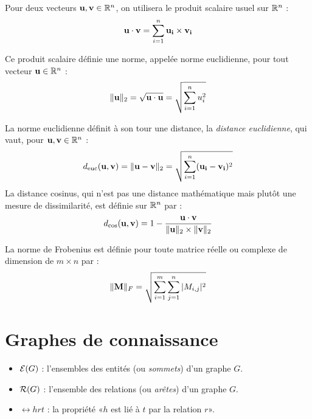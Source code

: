 Pour deux vecteurs $\bf{u, v} \in \R^n$, on utilisera le produit scalaire usuel sur $\R^n$ :
\begin{equation}
    \bf{u \cdot v} = \sum_{i=1}^{n} \bf{u_i \times v_i}
\end{equation}

Ce produit scalaire définie une norme, appelée norme euclidienne, pour tout vecteur $\bf{u} \in \R^n$ :
\begin{equation}
    \| \bf{u} \|_2 = \sqrt{\bf{u \cdot u}} = \sqrt{\sum_{i =1}^{n} u_i^2}
\end{equation}

La norme euclidienne définit à son tour une distance, la \textit{distance euclidienne}, qui vaut, pour $\bf{u, v} \in \R^n$ :
\begin{equation}
        d_\text{euc}(\bf{u, v}) = \| \bf{u - v} \|_2 = \sqrt{\sum_{i = 1}^{n} (\bf{u_i - v_i})^2}
\end{equation}
La distance cosinus, qui n'est pas une distance mathématique mais plutôt une mesure de dissimilarité, est définie sur $\R^n$ par :
\begin{equation}
    d_\text{cos}(\bf{u, v}) = 1 - \frac{\bf{u \cdot v}}{\| \bf{u} \|_2 \times \| \bf{v} \|_2 }
\end{equation}

La norme de Frobenius est définie pour toute matrice réelle ou complexe de dimension  de $m \times n$ par :
\begin{equation}
\| \bf{M} \|_F = \sqrt{\sum_{i=1}^{m} \sum_{j = 1}^{n} |M_{i, j}|^2}
\end{equation}

\section*{Graphes de connaissance}

\begin{itemize}
    \item $\Ent(G)$ : l'ensembles des entités (ou \textit{sommets}) d'un graphe $G$.
    \item $\Rel(G)$ : l'ensemble des relations (ou \textit{arêtes}) d'un graphe $G$.
    \item $\rel{h}{r}{t}$ : la propriété «$h$ est lié à $t$ par la relation $r$».
\end{itemize}